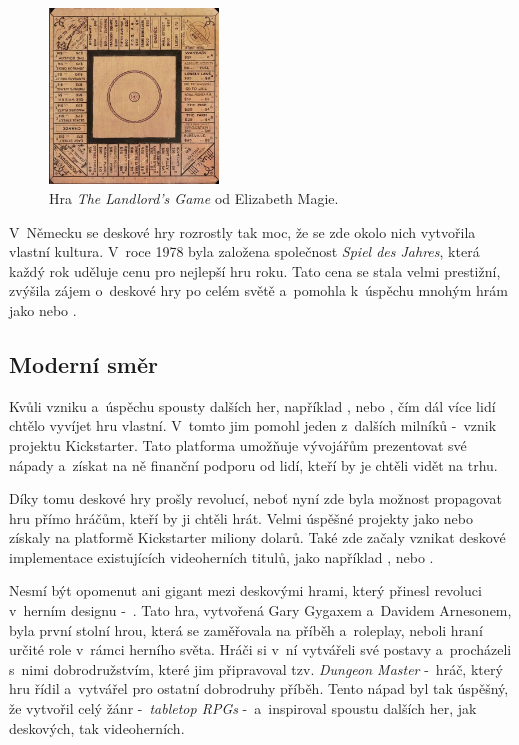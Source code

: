 \begin{figure}[h]
    \centering
    \includegraphics[width=0.4\textwidth]{figures/images/landlords-game.png}
    \caption{Hra \textit{The Landlord's Game} od Elizabeth Magie. \cite{attia_2018}}
    \label{fig:landlords-game}
\end{figure}

V~Německu se deskové hry rozrostly tak moc, že se zde okolo nich vytvořila vlastní kultura. V~roce 1978 byla založena společnost \textit{Spiel des Jahres}, která každý rok uděluje cenu pro nejlepší hru roku. Tato cena se stala velmi prestižní, zvýšila zájem o~deskové hry po celém světě a~pomohla k~úspěchu mnohým hrám jako  nebo . \cite{attia_2018}

\subsection{Moderní směr}
\label{subsec:modern}

Kvůli vzniku a~úspěchu spousty dalších her, například ,  nebo , čím dál více lidí chtělo vyvíjet hru vlastní. V~tomto jim pomohl jeden z~dalších milníků -~vznik projektu Kickstarter. Tato platforma umožňuje vývojářům prezentovat své nápady a~získat na ně finanční podporu od lidí, kteří by je chtěli vidět na trhu. \cite{attia_2018}

Díky tomu deskové hry prošly revolucí, neboť nyní zde byla možnost propagovat hru přímo hráčům, kteří by ji chtěli hrát. Velmi úspěšné projekty jako  nebo  získaly na platformě Kickstarter miliony dolarů. Také zde začaly vznikat deskové implementace existujících videoherních titulů, jako například ,  nebo . \cite{kickstarter}

Nesmí být opomenut ani gigant mezi deskovými hrami, který přinesl revoluci v~herním designu -~\textbf{}. Tato hra, vytvořená Gary Gygaxem a~Davidem Arnesonem, byla první stolní hrou, která se zaměřovala na příběh a~roleplay, neboli hraní určité role v~rámci herního světa. Hráči si v~ní vytvářeli své postavy a~procházeli s~nimi dobrodružstvím, které jim připravoval tzv. \textit{Dungeon Master} -~hráč, který hru řídil a~vytvářel pro ostatní dobrodruhy příběh. Tento nápad byl tak úspěšný, že vytvořil celý žánr -~\textit{tabletop RPGs} -~a~inspiroval spoustu dalších her, jak deskových, tak videoherních. \cite{dnd_beyond_2023}

